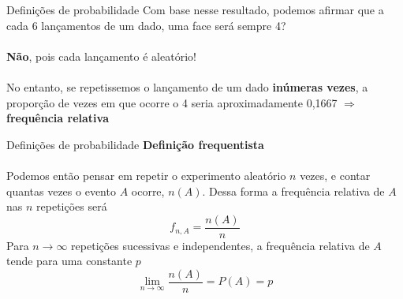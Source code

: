 \documentclass[10pt]{beamer}\usepackage[]{graphicx}\usepackage[]{color}
\theoremstyle{definition}
\begin{document}
\begin{frame}{Definições de probabilidade}
  Com base nesse resultado, podemos afirmar que a cada 6 lançamentos de
  um dado, uma face será sempre 4? \\~\\ \pause
  \textbf{Não}, pois cada lançamento é aleatório! \\~\\
  No entanto, se repetissemos o lançamento de um dado \textbf{inúmeras
    vezes}, a proporção de vezes em que ocorre o 4 seria aproximadamente
  0,1667 $\Rightarrow$ \textbf{frequência relativa}
\end{frame}

\begin{frame}{Definições de probabilidade}
  \textbf{Definição frequentista}\\~\\
  Podemos então pensar em repetir o experimento aleatório $n$ vezes, e
  contar quantas vezes o evento $A$ ocorre, $n(A)$. Dessa forma a
  frequência relativa de $A$ nas $n$ repetições será
  \begin{equation*}
    f_{n,A} = \frac{n(A)}{n}
  \end{equation*}
  Para $n \rightarrow \infty$ repetições sucessivas e independentes, a
  frequência relativa de $A$ tende para uma constante $p$
  \begin{equation*}
    \lim_{n \rightarrow \infty} \frac{n(A)}{n} = P(A) = p
  \end{equation*}
\end{frame}
\end{document}
